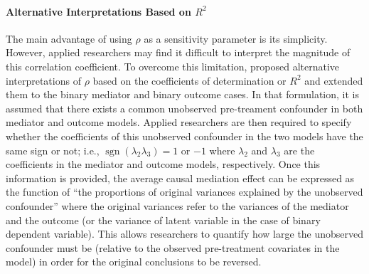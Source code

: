 \documentclass[11pt,letterpaper]{article}
\theoremstyle{plain}
\DeclareMathOperator{\sgn}{sgn}
\begin{document}
\paragraph{Alternative Interpretations Based on $R^2$}

The main advantage of using $\rho$ as a sensitivity parameter is its
simplicity.  However, applied researchers may find it difficult to
interpret the magnitude of this correlation coefficient.  To overcome
this limitation, \citet{imai:keel:yama:10} proposed alternative
interpretations of $\rho$ based on the coefficients of determination
or $R^2$ and \citet{imai:keel:ting:10} extended them to the binary
mediator and binary outcome cases.  In that formulation, it is assumed
that there exists a common unobserved pre-treament confounder in both
mediator and outcome models.  Applied researchers are then required to
specify whether the coefficients of this unobserved confounder in the
two models have the same sign or not; i.e.,
$\sgn(\lambda_2\lambda_3)=1$ or $-1$ where $\lambda_2$ and $\lambda_3$
are the coefficients in the mediator and outcome models, respectively.
Once this information is provided, the average causal mediation effect
can be expressed as the function of ``the proportions of original
variances explained by the unobserved confounder'' where the original
variances refer to the variances of the mediator and the outcome (or
the variance of latent variable in the case of binary dependent
variable).  This allows researchers to quantify how large the
unobserved confounder must be (relative to the observed pre-treatment
covariates in the model) in order for the original conclusions to be
reversed.
\end{document}
